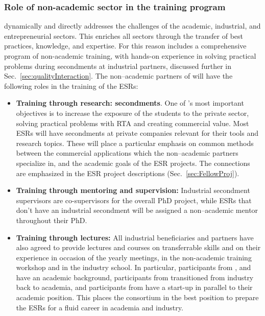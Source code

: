 \subsubsection{Role of non-academic sector in the training program}
\acronym dynamically and directly addresses the challenges of the academic, industrial, and entrepreneurial sectors. 
This enriches all sectors through the transfer of best practices, knowledge, and expertise.
For this reason \acronym includes a comprehensive program of non-academic training, with hands-on experience in solving practical problems during secondments at industrial partners, discussed further in Sec.~\ref{sec:qualityInteraction}.
The non--academic partners of \acronym will have the following roles in the training of the ESRs:
\begin{itemize}
\item \textbf{Training through research: secondments}. One of \acronym's most important objectives is to increase the exposure of the students to the private sector, solving practical problems with RTA and creating commercial value. 
Most ESRs will have secondments at private companies relevant for their tools and research topics.
These will place a particular emphasis on common methods between the commercial applications which the non--academic partners specialize in, and the academic goals of the ESR projects. 
The connections are emphasized in the ESR project descriptions (Sec.~\ref{sec:FellowProj}). 
\item \textbf{Training through mentoring and supervision:} Industrial secondment supervisors are co-supervisors for the overall PhD project, while ESRs that don't have an industrial secondment will be assigned a non--academic mentor throughout their PhD.
\item \textbf{Training through lectures: } All industrial beneficiaries and partners have also agreed to provide lectures and courses on transferrable skills and on their experience in occasion of the yearly meetings, in the non-academic training workshop and in the industry school. In particular, participants from \lightboxentity, \pointeightentity and \fleetmaticsentity have an academic background, participants from \uniboentity transitioned from industry back to academia, and participants from \ximantisentity have a start-up in parallel to their academic position. This places the consortium in the best position to prepare the ESRs for a fluid career in academia and industry. 
\end{itemize}

